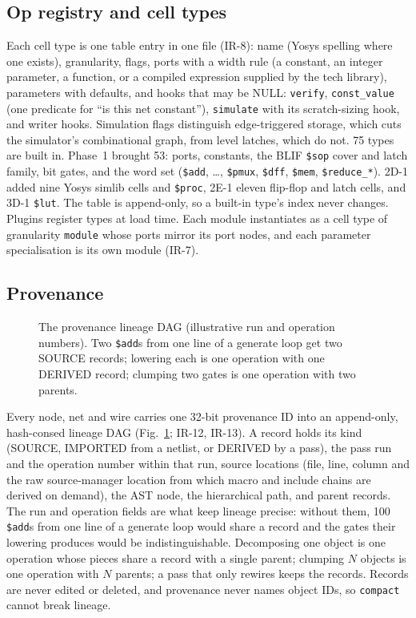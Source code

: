 \documentclass[conference]{IEEEtran}
\newcommand{\code}[1]{\texttt{#1}}
\begin{document}
\subsection{Op registry and cell types}

Each cell type is one table entry in one file (IR-8): name (Yosys spelling where one exists),
granularity, flags, ports with a width rule (a constant, an integer parameter, a function, or a
compiled expression supplied by the tech library), parameters with defaults, and hooks that may
be NULL: \code{verify}, \code{const\_value} (one predicate for ``is this net constant''),
\code{simulate} with its scratch-sizing hook, and writer hooks. Simulation flags distinguish
edge-triggered storage, which cuts the simulator's combinational graph, from level latches, which
do not. 75 types are built in. Phase~1 brought 53: ports, constants, the BLIF \code{\$sop} cover
and latch family, bit gates, and the word set (\code{\$add}, \ldots, \code{\$pmux},
\code{\$dff}, \code{\$mem}, \code{\$reduce\_*}). 2D-1 added nine Yosys simlib cells and
\code{\$proc}, 2E-1 eleven flip-flop and latch cells, and 3D-1 \code{\$lut}. The table is
append-only, so a built-in type's index never changes. Plugins register types at load time. Each module instantiates as a cell type of granularity \code{module} whose ports
mirror its port nodes, and each parameter specialisation is its own module (IR-7).

\subsection{Provenance}

\begin{figure}[t]
\centering
\odinfit{\columnwidth}{}
\caption{The provenance lineage DAG (illustrative run and operation numbers). Two \code{\$add}s from one line of a generate loop get two SOURCE records; lowering each is one operation with one DERIVED record; clumping two gates is one operation with two parents.}
\label{fig:prov}
\end{figure}



Every node, net and wire carries one 32-bit provenance ID into an append-only, hash-consed
lineage DAG (Fig.~\ref{fig:prov}; IR-12, IR-13). A record holds its kind (SOURCE, IMPORTED from a
netlist, or DERIVED by a pass), the pass run and the operation number within that run, source
locations (file, line, column and the raw source-manager location from which macro and include
chains are derived on demand), the AST node, the hierarchical path, and parent records. The
run and operation fields are what keep lineage precise: without them, 100 \code{\$add}s from one
line of a generate loop would share a record and the gates their lowering produces would be
indistinguishable. Decomposing one object is one operation whose pieces share a record with a
single parent; clumping $N$ objects is one operation with $N$ parents; a pass that only rewires
keeps the records. Records are never edited or deleted, and provenance never names object IDs,
so \code{compact} cannot break lineage.
\end{document}
